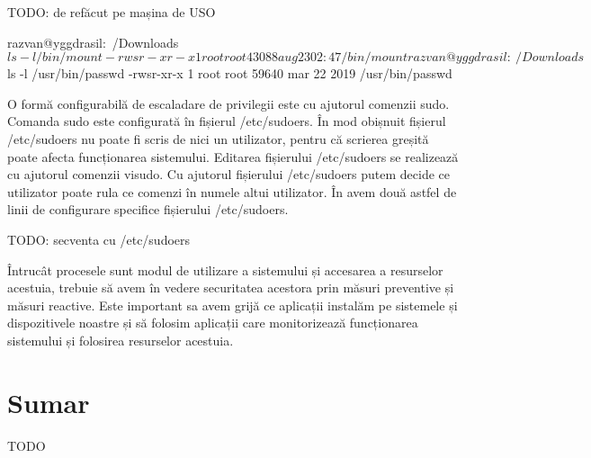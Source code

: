 TODO: de refăcut pe mașina de USO
\begin{screen}[caption={Bitul setuid},label={lst:sec:setuid}]
razvan@yggdrasil:~/Downloads$ ls -l /bin/mount
-rwsr-xr-x 1 root root 43088 aug 23 02:47 /bin/mount
razvan@yggdrasil:~/Downloads$ ls -l /usr/bin/passwd
-rwsr-xr-x 1 root root 59640 mar 22  2019 /usr/bin/passwd
\end{screen}

O formă configurabilă de escaladare de privilegii este cu ajutorul comenzii sudo. Comanda sudo este configurată în fișierul /etc/sudoers. În mod obișnuit fișierul /etc/sudoers nu poate fi scris de nici un utilizator, pentru că scrierea greșită poate afecta funcționarea sistemului. Editarea fișierului /etc/sudoers se realizează cu ajutorul comenzii visudo. Cu ajutorul fișierului /etc/sudoers putem decide ce utilizator poate rula ce comenzi în numele altui utilizator. În  avem două astfel de linii de configurare specifice fișierului /etc/sudoers.

\begin{screen}[caption={Secvență de configurație din fișierul /etc/sudoers},label={lst:sec:sudoers}]
TODO: secventa cu /etc/sudoers
\end{screen}

Întrucât procesele sunt modul de utilizare a sistemului și accesarea a resurselor acestuia, trebuie să avem în vedere securitatea acestora prin măsuri preventive și măsuri reactive. Este important sa avem grijă ce aplicații instalăm pe sistemele și dispozitivele noastre și să folosim aplicații care monitorizează funcționarea sistemului și folosirea resurselor acestuia.

\section{Sumar}
\label{sec:sec:summary}

TODO
